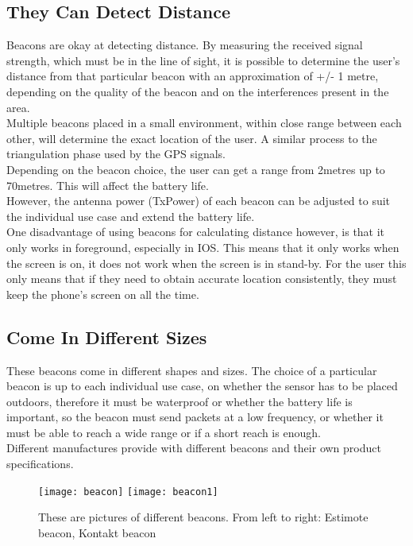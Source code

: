 \subsection{They Can Detect Distance}
Beacons are okay at detecting distance. By measuring the received signal strength, which must be in the line of sight, it is possible to determine the user’s distance from that particular beacon with an approximation of +/- 1 metre, depending on the quality of the beacon and on the interferences present in the area.\\
Multiple beacons placed in a small environment, within close range between each other, will determine the exact location of the user. A similar process to the triangulation phase used by the GPS signals.\\
Depending on the beacon choice, the user can get a range from 2metres up to 70metres. This will affect the battery life. \\
However, the antenna power (TxPower) of each beacon can be adjusted to suit the individual use case and extend the battery life.\\
One disadvantage of using beacons for calculating distance however, is that it only works in foreground, especially in IOS. This means that it only works when the screen is on, it does not work when the screen is in stand-by. For the user this only means that if they need to obtain accurate location consistently, they must keep the phone’s screen on all the time.\\
\subsection{Come In Different Sizes}
These beacons come in different shapes and sizes. The choice of a particular beacon is up to each individual use case, on whether the sensor has to be placed outdoors, therefore it must be waterproof or whether the battery life is important, so the beacon must send packets at a low frequency, or whether it must be able to reach a wide range or if a short reach is enough.\\
Different manufactures provide with different beacons and their own product specifications.

	\begin{figure}[h]
		\texttt{[image: beacon]}
		\texttt{[image: beacon1]}
		\caption{These are pictures of different beacons. From left to right: Estimote beacon, Kontakt beacon}
		\label{fig:beacon}
	\end{figure}

